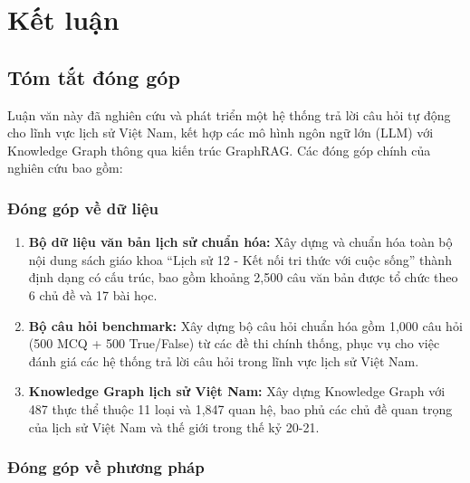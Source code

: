 \chapter{Kết luận}
\label{chap:conclusion}

\section{Tóm tắt đóng góp}

Luận văn này đã nghiên cứu và phát triển một hệ thống trả lời câu hỏi tự động cho lĩnh vực lịch sử Việt Nam, kết hợp các mô hình ngôn ngữ lớn (LLM) với Knowledge Graph thông qua kiến trúc GraphRAG. Các đóng góp chính của nghiên cứu bao gồm:

\subsection{Đóng góp về dữ liệu}

\begin{enumerate}
    \item \textbf{Bộ dữ liệu văn bản lịch sử chuẩn hóa:} Xây dựng và chuẩn hóa toàn bộ nội dung sách giáo khoa ``Lịch sử 12 - Kết nối tri thức với cuộc sống'' thành định dạng có cấu trúc, bao gồm khoảng 2,500 câu văn bản được tổ chức theo 6 chủ đề và 17 bài học.
    
    \item \textbf{Bộ câu hỏi benchmark:} Xây dựng bộ câu hỏi chuẩn hóa gồm 1,000 câu hỏi (500 MCQ + 500 True/False) từ các đề thi chính thống, phục vụ cho việc đánh giá các hệ thống trả lời câu hỏi trong lĩnh vực lịch sử Việt Nam.
    
    \item \textbf{Knowledge Graph lịch sử Việt Nam:} Xây dựng Knowledge Graph với 487 thực thể thuộc 11 loại và 1,847 quan hệ, bao phủ các chủ đề quan trọng của lịch sử Việt Nam và thế giới trong thế kỷ 20-21.
\end{enumerate}

\subsection{Đóng góp về phương pháp}

